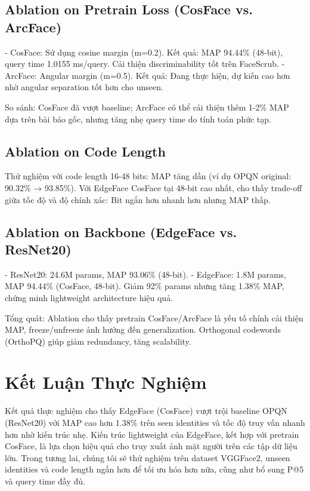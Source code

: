 \subsection{Ablation on Pretrain Loss (CosFace vs. ArcFace)}
- CosFace: Sử dụng cosine margin (m=0.2). Kết quả: MAP 94.44\% (48-bit), query time 1.0155 ms/query. Cải thiện discriminability tốt trên FaceScrub.
- ArcFace: Angular margin (m=0.5). Kết quả: Đang thực hiện, dự kiến cao hơn nhờ angular separation tốt hơn cho unseen.

So sánh: CosFace đã vượt baseline; ArcFace có thể cải thiện thêm 1-2\% MAP dựa trên bài báo gốc, nhưng tăng nhẹ query time do tính toán phức tạp.

\subsection{Ablation on Code Length}
Thử nghiệm với code length 16-48 bits: MAP tăng dần (ví dụ OPQN original: 90.32\% → 93.85\%). Với EdgeFace CosFace tại 48-bit cao nhất, cho thấy trade-off giữa tốc độ và độ chính xác: Bit ngắn hơn nhanh hơn nhưng MAP thấp.

\subsection{Ablation on Backbone (EdgeFace vs. ResNet20)}
- ResNet20: 24.6M params, MAP 93.06\% (48-bit).
- EdgeFace: 1.8M params, MAP 94.44\% (CosFace, 48-bit). Giảm 92\% params nhưng tăng 1.38\% MAP, chứng minh lightweight architecture hiệu quả.

Tổng quát: Ablation cho thấy pretrain CosFace/ArcFace là yếu tố chính cải thiện MAP, freeze/unfreeze ảnh hưởng đến generalization. Orthogonal codewords (OrthoPQ) giúp giảm redundancy, tăng scalability.

\section{Kết Luận Thực Nghiệm}
Kết quả thực nghiệm cho thấy EdgeFace (CosFace) vượt trội baseline OPQN (ResNet20) với MAP cao hơn 1.38\% trên seen identities và tốc độ truy vấn nhanh hơn nhờ kiến trúc nhẹ. Kiến trúc lightweight của EdgeFace, kết hợp với pretrain CosFace, là lựa chọn hiệu quả cho truy xuất ảnh mặt người trên các tập dữ liệu lớn. Trong tương lai, chúng tôi sẽ thử nghiệm trên dataset VGGFace2, unseen identities và code length ngắn hơn để tối ưu hóa hơn nữa, cũng như bổ sung P@5 và query time đầy đủ.